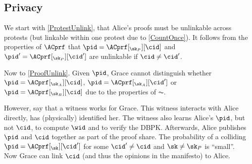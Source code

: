 \subsection{Privacy}

We start with \cref{ProtestUnlink}, that Alice's proofs must be unlinkable 
across protests (but linkable within one protest due to \cref{CountOnce}).
It follows from the properties of \(\ACprf\) that \(\pid = 
  \ACprf[_{\sk_P}][\cid]\) and \(\pid' = \ACprf[_{\sk_P}][\cid']\) are 
unlinkable if \(\cid\neq \cid'\).

Now to \cref{ProofUnlink}.
Given \(\pid\), Grace cannot distinguish whether \(\pid = 
  \ACprf[_{\sk_A}][\cid]\), \(\pid = \ACprf[_{\sk_A}][\cid']\) or \(\pid = 
  \ACprf[_{\sk_B}][\cid]\) due to the properties of \(\AC\).

However, say that a witness works for Grace.
This witness interacts with Alice directly, \ie has (physically) identified her.
The witness also learns Alice's \(\pid\), but not \(\cid\), to compute \(\wid\) 
and to verify the \ac{DBPK}.
Afterwards, Alice publishes \(\pid\) and \(\cid\) together as part of the proof 
share.
The probability of a colliding \(\pid = \ACprf[_\sk][\cid']\) for some \(\cid' 
  \neq \cid\) and \(\sk \neq \sk_P\) is \enquote{small}.
Now Grace can link \(\cid\) (and thus the opinions in the manifesto) to Alice.
